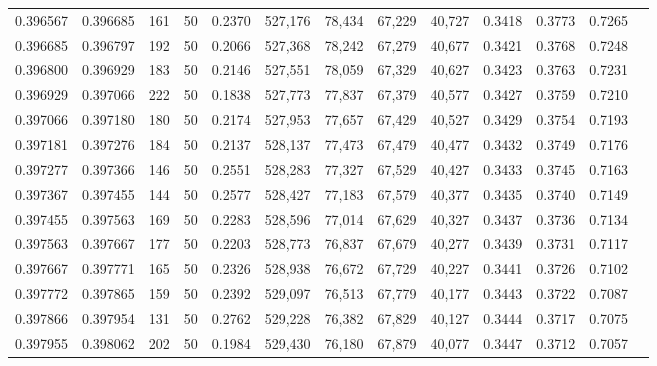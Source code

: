 \begin{tabular}{rrrrrrrrrrrrr}
0.396567 & 0.396685 &   161 &  50 &                                     0.2370 & 527,176 &  78,434 &  67,229 &  40,727 & 0.3418 & 0.3773 & 0.7265 \\
0.396685 & 0.396797 &   192 &  50 &                                     0.2066 & 527,368 &  78,242 &  67,279 &  40,677 & 0.3421 & 0.3768 & 0.7248 \\
0.396800 & 0.396929 &   183 &  50 &                                     0.2146 & 527,551 &  78,059 &  67,329 &  40,627 & 0.3423 & 0.3763 & 0.7231 \\
0.396929 & 0.397066 &   222 &  50 &                                     0.1838 & 527,773 &  77,837 &  67,379 &  40,577 & 0.3427 & 0.3759 & 0.7210 \\
0.397066 & 0.397180 &   180 &  50 &                                     0.2174 & 527,953 &  77,657 &  67,429 &  40,527 & 0.3429 & 0.3754 & 0.7193 \\
0.397181 & 0.397276 &   184 &  50 &                                     0.2137 & 528,137 &  77,473 &  67,479 &  40,477 & 0.3432 & 0.3749 & 0.7176 \\
0.397277 & 0.397366 &   146 &  50 &                                     0.2551 & 528,283 &  77,327 &  67,529 &  40,427 & 0.3433 & 0.3745 & 0.7163 \\
0.397367 & 0.397455 &   144 &  50 &                                     0.2577 & 528,427 &  77,183 &  67,579 &  40,377 & 0.3435 & 0.3740 & 0.7149 \\
0.397455 & 0.397563 &   169 &  50 &                                     0.2283 & 528,596 &  77,014 &  67,629 &  40,327 & 0.3437 & 0.3736 & 0.7134 \\
0.397563 & 0.397667 &   177 &  50 &                                     0.2203 & 528,773 &  76,837 &  67,679 &  40,277 & 0.3439 & 0.3731 & 0.7117 \\
0.397667 & 0.397771 &   165 &  50 &                                     0.2326 & 528,938 &  76,672 &  67,729 &  40,227 & 0.3441 & 0.3726 & 0.7102 \\
0.397772 & 0.397865 &   159 &  50 &                                     0.2392 & 529,097 &  76,513 &  67,779 &  40,177 & 0.3443 & 0.3722 & 0.7087 \\
0.397866 & 0.397954 &   131 &  50 &                                     0.2762 & 529,228 &  76,382 &  67,829 &  40,127 & 0.3444 & 0.3717 & 0.7075 \\
0.397955 & 0.398062 &   202 &  50 &                                     0.1984 & 529,430 &  76,180 &  67,879 &  40,077 & 0.3447 & 0.3712 & 0.7057 \\

\end{tabular}
